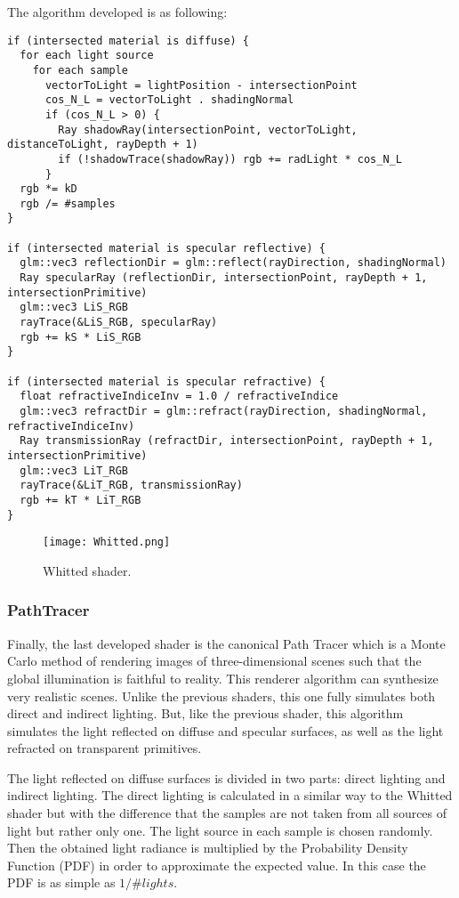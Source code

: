 \par
The algorithm developed is as following:

\begin{lstlisting}[caption={Algorithm of Whitted Shader}, captionpos=b, label=Whitted]
if (intersected material is diffuse) {
  for each light source
    for each sample
      vectorToLight = lightPosition - intersectionPoint
      cos_N_L = vectorToLight . shadingNormal
      if (cos_N_L > 0) {
        Ray shadowRay(intersectionPoint, vectorToLight, distanceToLight, rayDepth + 1)
        if (!shadowTrace(shadowRay)) rgb += radLight * cos_N_L
      }
  rgb *= kD
  rgb /= #samples
}

if (intersected material is specular reflective) {
  glm::vec3 reflectionDir = glm::reflect(rayDirection, shadingNormal)
  Ray specularRay (reflectionDir, intersectionPoint, rayDepth + 1, intersectionPrimitive)
  glm::vec3 LiS_RGB
  rayTrace(&LiS_RGB, specularRay)
  rgb += kS * LiS_RGB
}

if (intersected material is specular refractive) {
  float refractiveIndiceInv = 1.0 / refractiveIndice
  glm::vec3 refractDir = glm::refract(rayDirection, shadingNormal, refractiveIndiceInv)
  Ray transmissionRay (refractDir, intersectionPoint, rayDepth + 1, intersectionPrimitive)
  glm::vec3 LiT_RGB
  rayTrace(&LiT_RGB, transmissionRay)
  rgb += kT * LiT_RGB
}
\end{lstlisting}

\begin{figure}[H]
	\centering
	\caption{Whitted shader.}
	\label{Whitted shader.}
	\texttt{[image: Whitted.png]}
\end{figure}


\subsubsection{PathTracer}

\par
Finally, the last developed shader is the canonical Path Tracer which is a Monte Carlo method of rendering images of three-dimensional scenes such that the global illumination is faithful to reality.
This renderer algorithm can synthesize very realistic scenes.
Unlike the previous shaders, this one fully simulates both direct and indirect lighting.
But, like the previous shader, this algorithm simulates the light reflected on diffuse and specular surfaces, as well as the light refracted on transparent primitives.

\par
The light reflected on diffuse surfaces is divided in two parts: direct lighting and indirect lighting.
The direct lighting is calculated in a similar way to the Whitted shader but with the difference that the samples are not taken from all sources of light but rather only one.
The light source in each sample is chosen randomly.
Then the obtained light radiance is multiplied by the Probability Density Function (PDF) in order to approximate the expected value.
In this case the PDF is as simple as
$1 / \#lights$.

